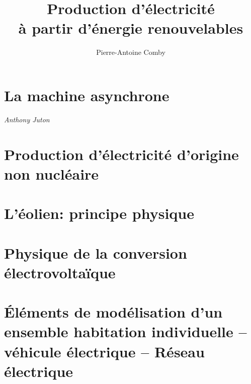 \documentclass[openany]{../../cours}
\author{Pierre-Antoine Comby}
\title{Production d'électricité\\à partir d'énergie renouvelables}
\begin{document}
\maketitle
\tableofcontents
\chapter{La machine asynchrone}
\emph{Anthony Juton}

\chapter{Production d'électricité d'origine non nucléaire}

\chapter{L'éolien: principe physique}\label{chap:eol}

\chapter{Physique de la conversion électrovoltaïque}\label{chap:photov}

\chapter{Éléments de modélisation d'un ensemble habitation individuelle --  véhicule électrique -- Réseau électrique}

\end{document}
